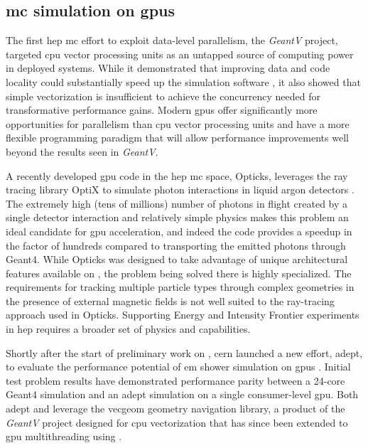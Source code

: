\subsection{\ac{mc} simulation on \acsp{gpu}}

The first \ac{hep} \ac{mc} effort to exploit data-level parallelism, the
\emph{GeantV} project, targeted \ac{cpu} vector processing units as an untapped
source of computing power in deployed systems. While it demonstrated that
improving data and code locality could substantially speed up the simulation
software \cite{GeantV_Results_2020}, it also showed that simple vectorization is
insufficient to achieve the concurrency needed for transformative performance
gains. Modern \acp{gpu} offer significantly more opportunities for parallelism
than \ac{cpu} vector processing units and have a more flexible programming
paradigm that will allow performance improvements well beyond the results seen
in \emph{GeantV}.

A recently developed \ac{gpu} code in the \ac{hep} \ac{mc} space, Opticks,
leverages the \nvidia ray tracing library OptiX to simulate photon interactions
in liquid argon detectors \cite{blyth_opticks_2019}. The extremely high (tens of
millions) number of photons in flight created by a single detector interaction
and relatively simple physics makes this problem an ideal candidate for \ac{gpu}
acceleration, and indeed the code provides a speedup in the factor of hundreds
compared to transporting the emitted photons through Geant4. While Opticks was
designed to take advantage of unique architectural features available on
\nvidia, the problem being solved there is highly specialized.  The requirements
for tracking multiple particle types through complex geometries in the presence
of external magnetic fields is not well suited to the ray-tracing approach used
in Opticks.  Supporting Energy and Intensity Frontier experiments in \ac{hep}
requires a broader set of physics and capabilities.

Shortly after the start of preliminary work on \celeritas, \acs{cern} launched a
new effort, \acs{adept}, to evaluate the performance potential of \ac{em} shower
simulation on \acp{gpu} \cite{andrei_gheata_adept_2020}. Initial
test problem results \cite{andrei_gheata_adept_2021,hahnfield_2021} have
demonstrated performance parity between a 24-core Geant4 simulation and an
\acs{adept} simulation on a single consumer-level \ac{gpu}. Both \acs{adept} and \celeritas leverage
the \acs{vecgeom} geometry navigation library, a product of the \emph{GeantV}
project designed for \ac{cpu} vectorization that has since been extended to
\ac{gpu} multithreading using \cuda \cite{apostolakis_towards_2015}.

